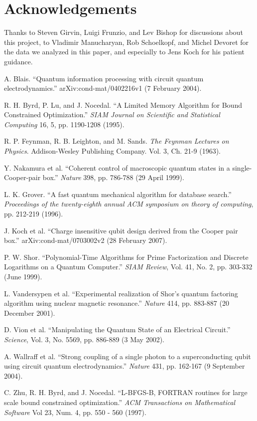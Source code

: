 \documentclass[twocolumn]{revtex4}
\begin{document}
\section{Acknowledgements}
Thanks to Steven Girvin, Luigi Frunzio, and Lev Bishop for discussions
about this project, to Vladimir Manucharyan, Rob Schoelkopf, and
Michel Devoret for the data we analyzed in this paper, and especially
to Jens Koch for his patient guidance.

\begin{thebibliography}{9}
 A. Blais. ``Quantum information processing with
  circuit quantum electrodynamics.'' arXiv:cond-mat/0402216v1 (7
  February 2004).

 R. H. Byrd, P. Lu, and J. Nocedal. ``A Limited Memory
  Algorithm for Bound Constrained Optimization.'' \textit{SIAM Journal
    on Scientific and Statistical Computing} 16, 5,
  pp. 1190-1208 (1995).
  
 R. P. Feynman, R. B. Leighton, and
  M. Sands. \textit{The Feynman Lectures on Physics}. Addison-Wesley
  Publishing Company. Vol. 3, Ch. 21-9 (1963).

 Y. Nakamura et al. ``Coherent control of
  macroscopic quantum states in a single-Cooper-pair box.''
  \textit{Nature} 398, pp. 786-788 (29 April 1999).

 L. K. Grover. ``A fast quantum mechanical algorithm
  for database search.'' \textit{Proceedings of the twenty-eighth
    annual ACM symposium on theory of computing}, pp. 212-219 (1996).

 J. Koch et al. ``Charge insensitive qubit design
  derived from the Cooper pair box.'' arXiv:cond-mat/0703002v2 (28
  February 2007).

 P. W. Shor. ``Polynomial-Time Algorithms for Prime
  Factorization and Discrete Logarithms on a Quantum Computer.''
  \textit{SIAM Review}, Vol. 41, No. 2, pp. 303-332 (June 1999).

 L. Vandersypen et al. ``Experimental realization
  of Shor's quantum factoring algorithm using nuclear magnetic
  resonance.'' \textit{Nature} 414, pp. 883-887 (20 December 2001).

 D. Vion et al. ``Manipulating the Quantum State of an
  Electrical Circuit.'' \textit{Science}, Vol. 3, No. 5569,
  pp. 886-889 (3 May 2002).
  
 A. Wallraff et al. ``Strong coupling of a single
  photon to a superconducting qubit using circuit quantum
  electrodynamics.'' \textit{Nature} 431, pp. 162-167 (9 September
  2004).

 C. Zhu, R. H. Byrd, and J. Nocedal. ``L-BFGS-B, FORTRAN
  routines for large scale bound constrained optimization.''
  \textit{ACM Transactions on Mathematical Software} Vol 23, Num. 4,
  pp. 550 - 560 (1997).

\end{thebibliography}
\end{document}
